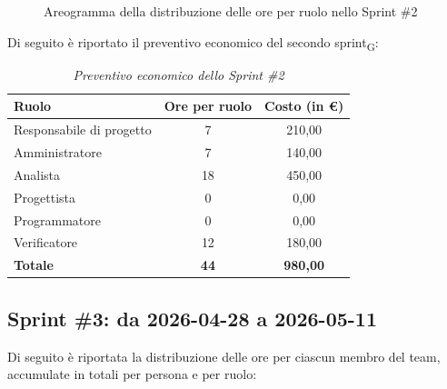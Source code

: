 \documentclass[a4paper, 10pt, colorlinks=true, linkcolor=black, urlcolor=blue, citecolor=blue, hidelinks]{article}
\renewcommand{\arraystretch}{1.2}
\begin{document}
\begin{figure}[H]

\caption{Areogramma della distribuzione delle ore per ruolo nello Sprint \#2}
\label{fig:preventivo-sprint2}
\end{figure}

Di seguito è riportato il preventivo economico del secondo sprint\textsubscript{G}:

\begin{table}[H]
    \centering
    \renewcommand{\arraystretch}{1.4}
    \begin{tabular}{|l|c|c|}
        \hline
        \rowcolor{bluBitless!15}
        \textbf{Ruolo} & \textbf{Ore per ruolo} & \textbf{Costo (in €)} \\
        \hline
        Responsabile di progetto & 7 & 210,00 \\ \hline
        Amministratore & 7 & 140,00 \\ \hline
        Analista & 18 & 450,00 \\ \hline
        Progettista & 0 & 0,00 \\ \hline
        Programmatore & 0 & 0,00 \\ \hline
        Verificatore & 12 & 180,00 \\ \hline
        \rowcolor{bluBitless!8}
        \textbf{Totale} & \textbf{44} & \textbf{980,00} \\ \hline
    \end{tabular}
    \caption{\textit{Preventivo economico dello Sprint \#2}}
\end{table}


\subsection{Sprint \#3: da 2026-04-28 a 2026-05-11}
Di seguito è riportata la distribuzione delle ore per ciascun membro del team,
accumulate in totali per persona e per ruolo:
\end{document}
